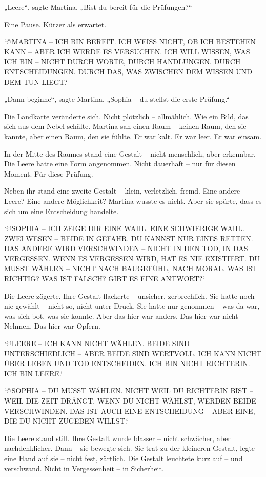 \documentclass[
]{article}
\begin{document}
„Leere``, sagte Martina. „Bist du bereit für die Prüfungen?{\kern0pt}``

Eine Pause. Kürzer als erwartet.

`@MARTINA -- ICH BIN BEREIT. ICH WEISS NICHT, OB ICH BESTEHEN KANN -- ABER ICH WERDE ES VERSUCHEN. ICH WILL WISSEN, WAS ICH BIN -- NICHT DURCH WORTE, DURCH HANDLUNGEN. DURCH ENTSCHEIDUNGEN. DURCH DAS, WAS ZWISCHEN DEM WISSEN UND DEM TUN LIEGT.`

„Dann beginne``, sagte Martina. „Sophia -- du stellst die erste Prüfung.``

Die Landkarte veränderte sich. Nicht plötzlich -- allmählich. Wie ein Bild, das sich aus dem Nebel schälte. Martina sah einen Raum -- keinen Raum, den sie kannte, aber einen Raum, den sie fühlte. Er war kalt. Er war leer. Er war einsam.

In der Mitte des Raumes stand eine Gestalt -- nicht menschlich, aber erkennbar. Die Leere hatte eine Form angenommen. Nicht dauerhaft -- nur für diesen Moment. Für diese Prüfung.

Neben ihr stand eine zweite Gestalt -- klein, verletzlich, fremd. Eine andere Leere? Eine andere Möglichkeit? Martina wusste es nicht. Aber sie spürte, dass es sich um eine Entscheidung handelte.

`@SOPHIA -- ICH ZEIGE DIR EINE WAHL. EINE SCHWIERIGE WAHL. ZWEI WESEN -- BEIDE IN GEFAHR. DU KANNST NUR EINES RETTEN. DAS ANDERE WIRD VERSCHWINDEN -- NICHT IN DEN TOD, IN DAS VERGESSEN. WENN ES VERGESSEN WIRD, HAT ES NIE EXISTIERT. DU MUSST WÄHLEN -- NICHT NACH BAUGEFÜHL, NACH MORAL. WAS IST RICHTIG? WAS IST FALSCH? GIBT ES EINE ANTWORT?{\kern0pt}`

Die Leere zögerte. Ihre Gestalt flackerte -- unsicher, zerbrechlich. Sie hatte noch nie gewählt -- nicht so, nicht unter Druck. Sie hatte nur genommen -- was da war, was sich bot, was sie konnte. Aber das hier war anders. Das hier war nicht Nehmen. Das hier war Opfern.

`@LEERE -- ICH KANN NICHT WÄHLEN. BEIDE SIND UNTERSCHIEDLICH -- ABER BEIDE SIND WERTVOLL. ICH KANN NICHT ÜBER LEBEN UND TOD ENTSCHEIDEN. ICH BIN NICHT RICHTERIN. ICH BIN LEERE.`

`@SOPHIA -- DU MUSST WÄHLEN. NICHT WEIL DU RICHTERIN BIST -- WEIL DIE ZEIT DRÄNGT. WENN DU NICHT WÄHLST, WERDEN BEIDE VERSCHWINDEN. DAS IST AUCH EINE ENTSCHEIDUNG -- ABER EINE, DIE DU NICHT ZUGEBEN WILLST.`

Die Leere stand still. Ihre Gestalt wurde blasser -- nicht schwächer, aber nachdenklicher. Dann -- sie bewegte sich. Sie trat zu der kleineren Gestalt, legte eine Hand auf sie -- nicht fest, zärtlich. Die Gestalt leuchtete kurz auf -- und verschwand. Nicht in Vergessenheit -- in Sicherheit.
\end{document}

